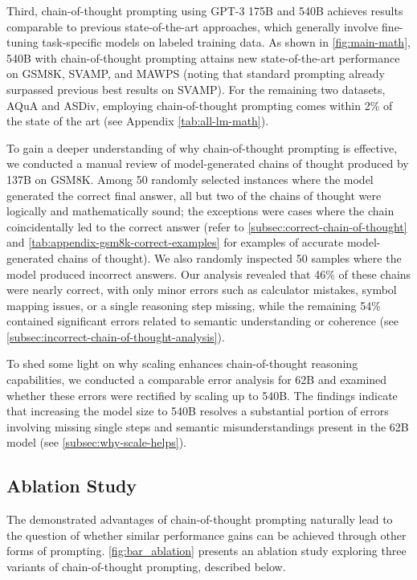 Third, chain-of-thought prompting using GPT-3 175B and \palm{} 540B achieves results comparable to previous state-of-the-art approaches, which generally involve fine-tuning task-specific models on labeled training data. 
As shown in \cref{fig:main-math}, \palm{} 540B with chain-of-thought prompting attains new state-of-the-art performance on GSM8K, SVAMP, and MAWPS (noting that standard prompting already surpassed previous best results on SVAMP). For the remaining two datasets, AQuA and ASDiv, \palm{} employing chain-of-thought prompting comes within 2\% of the state of the art (see Appendix \cref{tab:all-lm-math}).

To gain a deeper understanding of why chain-of-thought prompting is effective, we conducted a manual review of model-generated chains of thought produced by \lamda{} 137B on GSM8K. Among 50 randomly selected instances where the model generated the correct final answer, all but two of the chains of thought were logically and mathematically sound; the exceptions were cases where the chain coincidentally led to the correct answer (refer to \cref{subsec:correct-chain-of-thought} and \cref{tab:appendix-gsm8k-correct-examples} for examples of accurate model-generated chains of thought). We also randomly inspected 50 samples where the model produced incorrect answers. Our analysis revealed that 46\% of these chains were nearly correct, with only minor errors such as calculator mistakes, symbol mapping issues, or a single reasoning step missing, while the remaining 54\% contained significant errors related to semantic understanding or coherence (see \cref{subsec:incorrect-chain-of-thought-analysis}). 

To shed some light on why scaling enhances chain-of-thought reasoning capabilities, we conducted a comparable error analysis for \palm{} 62B and examined whether these errors were rectified by scaling up to \palm{} 540B. The findings indicate that increasing the model size to 540B resolves a substantial portion of errors involving missing single steps and semantic misunderstandings present in the 62B model (see \cref{subsec:why-scale-helps}).

\subsection{Ablation Study}\label{subsec:math-ablation}

The demonstrated advantages of chain-of-thought prompting naturally lead to the question of whether similar performance gains can be achieved through other forms of prompting. \cref{fig:bar_ablation} presents an ablation study exploring three variants of chain-of-thought prompting, described below.

